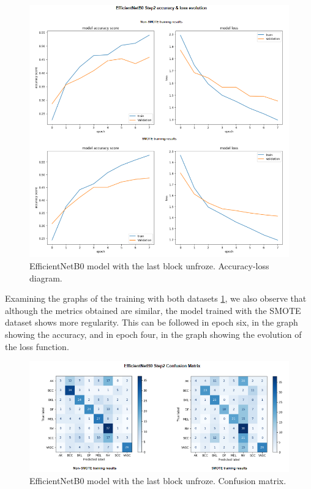 \begin{figure}[ht]
    \begin{center}
        \includegraphics[scale=0.6]{images/Building/Model Efficientnet/modelENetB0_2_model accuray-loss.png}
        \caption{EfficientNetB0 model with the last block unfroze. Accuracy-loss diagram.}
    \label{fig: Model_ENet_2_accuracy_loss}    
    \end{center}
\end{figure}

Examining the graphs of the training with both datasets \ref{fig: Model_ENet_2_accuracy_loss}, we also observe that although the metrics obtained are similar, the model trained with the SMOTE dataset shows more regularity. This can be followed in epoch six, in the graph showing the accuracy, and in epoch four, in the graph showing the evolution of the loss function. 


\begin{figure}[ht]
    \begin{center}
        \includegraphics[scale=0.80]{images/Building/Model Efficientnet/model_ENetB0_2 Confmat.png}
        \caption{EfficientNetB0 model with the last block unfroze. Confusion matrix.}
    \label{fig: Model_ENet_2_confmat}    
    \end{center}
\end{figure}

